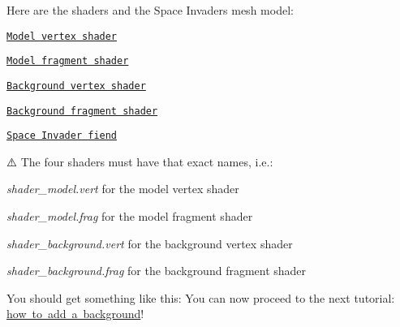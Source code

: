 Here are the shaders and the Space Invaders mesh model\+:
\begin{DoxyItemize}
\item \href{https://github.com/robotology/superimpose-mesh-lib/blob/gh-pages/doxygen/tutorial_code/shader_model.vert}{\tt Model vertex shader}
\item \href{https://github.com/robotology/superimpose-mesh-lib/blob/gh-pages/doxygen/tutorial_code/shader_model.frag}{\tt Model fragment shader}
\item \href{https://github.com/robotology/superimpose-mesh-lib/blob/gh-pages/doxygen/tutorial_code/shader_background.vert}{\tt Background vertex shader}
\item \href{https://github.com/robotology/superimpose-mesh-lib/blob/gh-pages/doxygen/tutorial_code/shader_background.frag}{\tt Background fragment shader}
\item \href{https://github.com/robotology/superimpose-mesh-lib/blob/gh-pages/doxygen/tutorial_code/Space_Invader.obj}{\tt Space Invader fiend}
\end{DoxyItemize}

⚠️ The four shaders must have that exact names, i.\+e.\+:
\begin{DoxyItemize}
\item {\itshape shader\+\_\+model.\+vert} for the model vertex shader
\item {\itshape shader\+\_\+model.\+frag} for the model fragment shader
\item {\itshape shader\+\_\+background.\+vert} for the background vertex shader
\item {\itshape shader\+\_\+background.\+frag} for the background fragment shader
\end{DoxyItemize}

You should get something like this\+:  You can now proceed to the next tutorial\+: \mbox{\hyperlink{tutorial_superimpose_background}{how to add a background}}! 